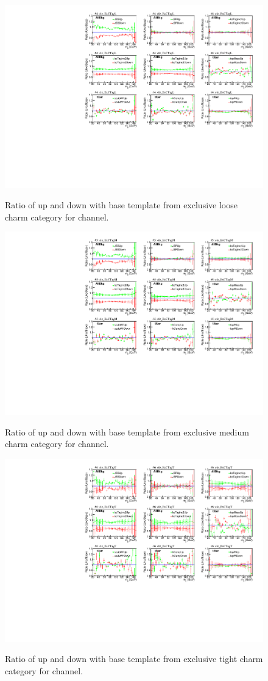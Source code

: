 \begin{figure}
    \centering  
    {\includegraphics[width=0.80\linewidth]{Image/SYS/RatioBaseSys/mjj_4_ele_ExCTagL.pdf}}
    \caption{ Ratio of up and down with base template from exclusive loose charm category for \ejets channel.}
    \label{fig:shapeVslnN4}
\end{figure}
\begin{figure}
    \centering  
    {\includegraphics[width=0.80\linewidth]{Image/SYS/RatioBaseSys/mjj_5_ele_ExCTagM.pdf}}
    \caption{ Ratio of up and down with base template from exclusive medium charm category for \ejets channel. }
    \label{fig:shapeVslnN5}
\end{figure}


\begin{figure}
    \centering  
    {\includegraphics[width=0.80\linewidth]{Image/SYS/RatioBaseSys/mjj_6_ele_ExCTagT.pdf}}
    \caption{ Ratio of up and down with base template from exclusive tight charm category for \ejets channel.}
    \label{fig:shapeVslnN6}
\end{figure}

